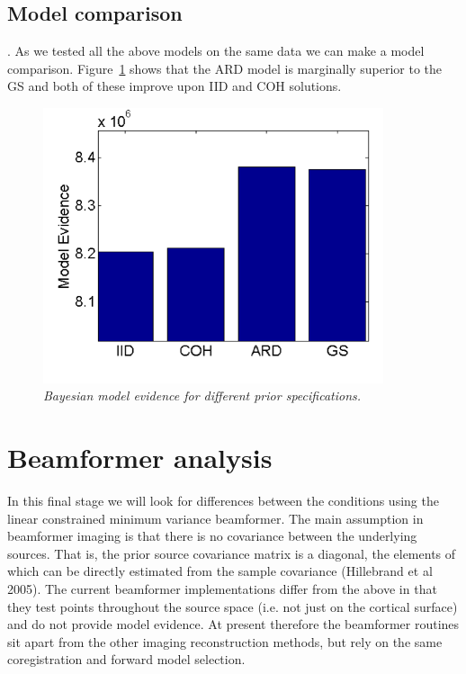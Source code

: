 \subsection{Model comparison}.
As we tested all the above models on the same data we can make a model comparison. Figure~\ref{meg_sloc:fig:9} shows that the ARD model is marginally superior to the GS and both of these improve upon IID and COH solutions.

\begin{figure}
\begin{center}
\includegraphics[width=100mm]{meg_sloc/Slide9}
\caption{\em Bayesian model evidence for different prior specifications.\label{meg_sloc:fig:9}}
\end{center}
\end{figure}


\section{Beamformer analysis}
In this final stage we will look for differences between the conditions using the linear constrained minimum variance beamformer. The main assumption in beamformer imaging is that there is no covariance between the underlying sources. That is, the prior source covariance matrix is a diagonal, the elements of which can be directly estimated from the sample covariance (Hillebrand et al 2005).
The current beamformer implementations differ from the above in that they test points throughout the source space (i.e. not just on the cortical surface) and do not provide model evidence. At present therefore the beamformer routines sit apart from the other imaging reconstruction methods, but rely on the same coregistration and forward model selection.

